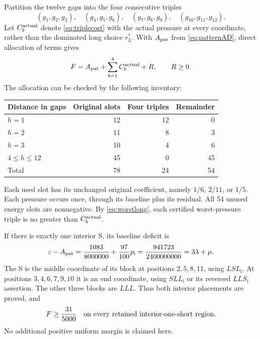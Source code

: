 \documentclass[11pt]{amsart}
\numberwithin{equation}{section}
\newcommand{\eps}{\varepsilon}
\newcommand{\pint}{p_{\mathrm i}}
\begin{document}
Partition the twelve gaps into the four consecutive triples
\begin{equation}\label{eq:partition}
 (g_1,g_2,g_3),\quad(g_4,g_5,g_6),\quad
 (g_7,g_8,g_9),\quad(g_{10},g_{11},g_{12}).
\end{equation}
Let $C_b^{\rm actual}$ denote \eqref{eq:triplecost} with the
actual pressure at every coordinate, rather than the dominated
long choice $r_L^*$. With $A_{\rm pat}$ from
\eqref{eq:patternAD}, direct allocation of terms gives
\begin{equation}\label{eq:assemblyidentity}
 F=A_{\rm pat}+\sum_{b=1}^4C_b^{\rm actual}+R,
 \qquad R\geq0.
\end{equation}
The allocation can be checked by the following inventory:
\begin{center}\small
\begin{tabular}{@{}lrrr@{}}
\toprule
Distance in gaps & Original slots & Four triples & Remainder\\
\midrule
$h=1$ & 12 & 12 & 0\\
$h=2$ & 11 & 8 & 3\\
$h=3$ & 10 & 4 & 6\\
$4\leq h\leq12$ & 45 & 0 & 45\\
\midrule
Total & 78 & 24 & 54\\
\bottomrule
\end{tabular}
\end{center}
Each used slot has its unchanged original coefficient, namely
$1/6$, $2/11$, or $1/5$. Each pressure occurs once, through its
baseline plus its residual. All 54 unused energy slots are
nonnegative. By \eqref{eq:worstlong}, each certified worst-pressure
triple is no greater than $C_b^{\rm actual}$.

If there is exactly one interior S, its baseline deficit is
\begin{equation}\label{eq:interiordeficit}
 \eps-A_{\rm pat}=\frac{1083}{8000000}
                         +\frac{97}{100}\pint
    =\frac{941723}{2400000000}=3\lambda+\mu.
\end{equation}
The S is the middle coordinate of its block at positions
$2,5,8,11$, using $LSL_{\mathrm i}$. At positions
$3,4,6,7,9,10$ it is an end coordinate, using $SLL_{\mathrm i}$
or its reversed $LLS_{\mathrm i}$ assertion. The other three
blocks are $LLL$. Thus both interior placements are proved, and
\begin{equation}\label{eq:interiorconclusion}
 F\geq\frac{31}{5000}
 \quad\hbox{on every retained interior-one-short region}.
\end{equation}
No additional positive uniform margin is claimed here.
\end{document}

